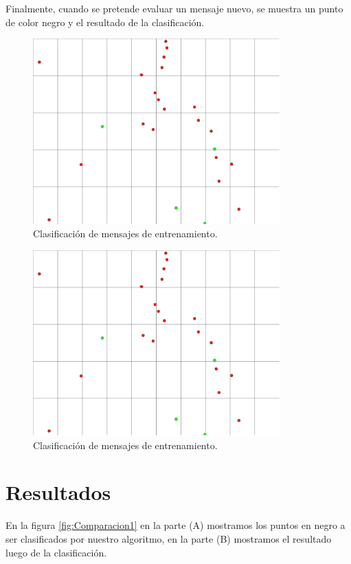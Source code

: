 Finalmente, cuando se pretende evaluar un mensaje nuevo, se muestra un punto de color negro y el resultado de la clasificación.

\begin{figure}[h!]
	\begin{center}
	\includegraphics[angle=0,width=9.5cm]{Graficos/knn_train}
	\caption{Clasificación de mensajes de entrenamiento.}
	\label{fig:knn_train}
  \end{center}
\end{figure}


\begin{figure}[h!]
	\begin{center}
	\includegraphics[angle=0,width=9.5cm]{Graficos/knn_train_results}
	\caption{Clasificación de mensajes de entrenamiento.}
	\label{fig:knn_train_results}
  \end{center}
\end{figure}


\section{Resultados}

En la figura  \ref{fig:Comparacion1}   en la parte (A) mostramos los puntos en negro a ser clasificados por nuestro algoritmo, en la parte (B) mostramos el resultado luego de la clasificación.


